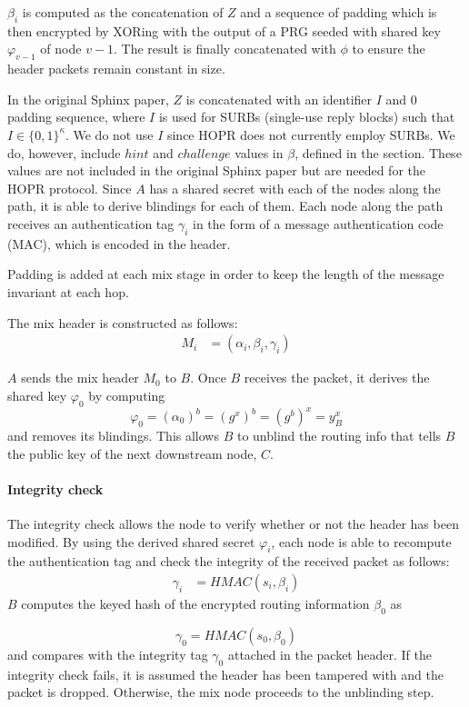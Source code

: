 $\beta_i$ is computed as the concatenation of $Z$ and a sequence of padding which is then encrypted by XORing with the output of a PRG seeded with shared key $\varphi_{v-1}$ of node $v-1$. The result is finally concatenated with $\phi$ to ensure the header packets remain constant in size.
    
In the original Sphinx paper, $Z$ is concatenated with an identifier $I$
    and $0$ padding sequence, where $I$ is used for SURBs (single-use reply
    blocks) such that $I \in \{0, 1\}^\kappa$. We do not use $I$ since HOPR does not
    currently employ SURBs. We do, however, include $hint$ and $challenge$ values in
    $\beta$, defined in the  section. These values are not included in the original Sphinx paper but are needed for the HOPR protocol.
    Since $A$ has a shared secret with each of the nodes along the path, it is able to derive blindings for each of them.
    Each node along the path receives an authentication tag $\gamma_i$ in the form of a message authentication code (MAC),
which is encoded in the header.

Padding is added at each mix stage in order to keep the length of the message invariant at each hop.

The mix header is constructed as follows: 
\begin{align}  
    M_i&=(\alpha_i,\beta_i,\gamma_i)
\end{align}

$A$ sends the mix header $M_0$ to $B$. Once $B$ receives the packet, it derives the shared key $\varphi_0$ by computing $$\varphi_0=(\alpha_0)^b=(g^x)^b=(g^b)^x=y^x_B$$
and removes its blindings. This allows $B$ to unblind the routing info that tells $B$ the public key of the next downstream node, $C$.
\paragraph{Integrity check}
The integrity check allows the node to verify whether or not the header has been modified. By using the derived shared secret $\varphi_i$, each node is able to recompute the authentication tag and check the integrity of the received packet as follows: 
\begin{align}  
    \gamma_i&=HMAC(s_i,\beta_i)
    \label{eq:6}
\end{align}
$B$ computes the keyed hash of the encrypted routing information $\beta_0$ as

    $$\gamma_0=HMAC(s_0,\beta_0)$$
and compares with the integrity tag $\gamma_0$ attached in the packet header. If the integrity check fails, it is assumed the header has been tampered with and the packet is dropped. Otherwise, the mix node proceeds to the unblinding step.

